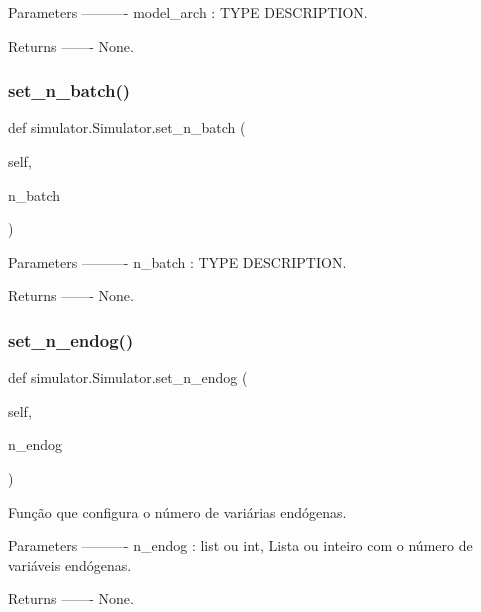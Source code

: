 \begin{DoxyVerb}Parameters
----------
model_arch : TYPE
    DESCRIPTION.

Returns
-------
None.\end{DoxyVerb}
 \mbox{\label{classsimulator_1_1Simulator_a2d17c0bee07f7fe69798d1ca6fec25f2}} 
\subsubsection{\texorpdfstring{set\+\_\+n\+\_\+batch()}{set\_n\_batch()}}
{\footnotesize\ttfamily def simulator.\+Simulator.\+set\+\_\+n\+\_\+batch (\begin{DoxyParamCaption}\item[{}]{self,  }\item[{}]{n\+\_\+batch }\end{DoxyParamCaption})}

\begin{DoxyVerb}Parameters
----------
n_batch : TYPE
    DESCRIPTION.

Returns
-------
None.\end{DoxyVerb}
 \mbox{\label{classsimulator_1_1Simulator_a3ac8ba88f547844185800ee333e99bde}} 
\subsubsection{\texorpdfstring{set\+\_\+n\+\_\+endog()}{set\_n\_endog()}}
{\footnotesize\ttfamily def simulator.\+Simulator.\+set\+\_\+n\+\_\+endog (\begin{DoxyParamCaption}\item[{}]{self,  }\item[{}]{n\+\_\+endog }\end{DoxyParamCaption})}

\begin{DoxyVerb}Função que configura o número de variárias endógenas.

Parameters
----------
n_endog : list ou int,
    Lista ou inteiro com o número de variáveis endógenas.

Returns
-------
None.\end{DoxyVerb}
 \mbox{\label{classsimulator_1_1Simulator_a593b40c681ffdf64d3c183b6bfaea04f}} 
